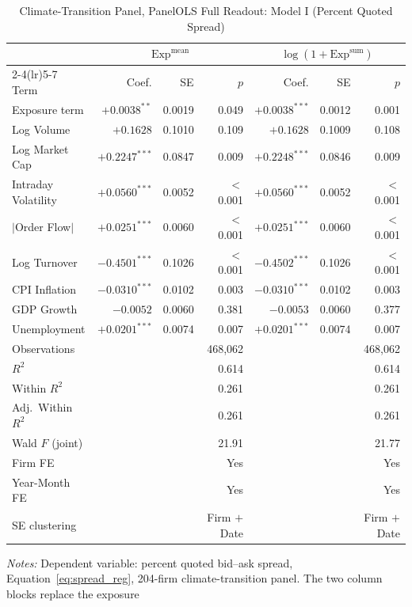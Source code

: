 \begin{table}[htbp]
\centering
\caption{Climate-Transition Panel, PanelOLS Full Readout: Model I (Percent Quoted Spread)}
\label{tab:v2_full_modelI}
\begin{threeparttable}
\small
\setlength{\tabcolsep}{4pt}
\begin{tabular}{l r r r r r r}
\toprule
 & \multicolumn{3}{c}{$\mathrm{Exp}^{\text{mean}}$} & \multicolumn{3}{c}{$\log(1+\mathrm{Exp}^{\text{sum}})$} \\
\cmidrule(lr){2-4}\cmidrule(lr){5-7}
Term & Coef. & SE & $p$ & Coef. & SE & $p$ \\
\midrule
Exposure term & $+0.0038^{**}$ & 0.0019 & 0.049 & $+0.0038^{***}$ & 0.0012 & 0.001 \\
Log Volume & $+0.1628$ & 0.1010 & 0.109 & $+0.1628$ & 0.1009 & 0.108 \\
Log Market Cap & $+0.2247^{***}$ & 0.0847 & 0.009 & $+0.2248^{***}$ & 0.0846 & 0.009 \\
Intraday Volatility & $+0.0560^{***}$ & 0.0052 & $<$0.001 & $+0.0560^{***}$ & 0.0052 & $<$0.001 \\
$|$Order Flow$|$ & $+0.0251^{***}$ & 0.0060 & $<$0.001 & $+0.0251^{***}$ & 0.0060 & $<$0.001 \\
Log Turnover & $-0.4501^{***}$ & 0.1026 & $<$0.001 & $-0.4502^{***}$ & 0.1026 & $<$0.001 \\
CPI Inflation & $-0.0310^{***}$ & 0.0102 & 0.003 & $-0.0310^{***}$ & 0.0102 & 0.003 \\
GDP Growth & $-0.0052$ & 0.0060 & 0.381 & $-0.0053$ & 0.0060 & 0.377 \\
Unemployment & $+0.0201^{***}$ & 0.0074 & 0.007 & $+0.0201^{***}$ & 0.0074 & 0.007 \\
\midrule
Observations & & & 468,062 & & & 468,062 \\
$R^2$ & & & 0.614 & & & 0.614 \\
Within $R^2$ & & & 0.261 & & & 0.261 \\
Adj.\ Within $R^2$ & & & 0.261 & & & 0.261 \\
Wald $F$ (joint) & & & 21.91 & & & 21.77 \\
Firm FE & & & Yes & & & Yes \\
Year-Month FE & & & Yes & & & Yes \\
SE clustering & & & Firm $+$ Date & & & Firm $+$ Date \\
\bottomrule
\end{tabular}
\begin{tablenotes}
\small
\item \textit{Notes:} Dependent variable: percent quoted bid--ask spread, Equation~\ref{eq:spread_reg}, 204-firm climate-transition panel. The two column blocks replace the exposure

\end{tablenotes}
\end{threeparttable}
\end{table}
